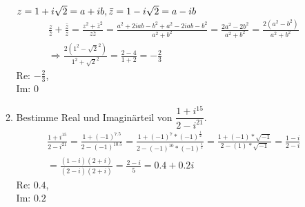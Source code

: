 \documentclass[12pt,letterpaper]{article}
\begin{document}
\begin{enumerate}
\begin{enumerate}
$z = 1+i\sqrt{2} = a+ib,\\
\bar{z} = 1-i\sqrt{2} = a-ib$
\begin{align*}
\frac{z}{\bar{z}}+\frac{\bar{z}}{z} = \frac{z^2+\bar{z}^2}{z\bar{z}} = \frac{a^2+2iab-b^2+a^2-2iab-b^2}{a^2+b^2} = \frac{2a^2-2b^2}{a^2+b^2} = \frac{2(a^2-b^2)}{a^2+b^2}\\
\Rightarrow\frac{2(1^2-\sqrt{2}^2)}{1^2+\sqrt{2}^2}=\frac{2-4}{1+2} = -\frac{2}{3}
\end{align*}
Re: $-\frac{2}{3}$,\\
Im: $0$
\item Bestimme Real und Imaginärteil von $\dfrac{1+i^{15}}{2-i^{21}}$.
\begin{align*}
\frac{1+i^{15}}{2-i^{21}} = \frac{1+(-1)^{7.5}}{2-(-1)^{10.5}} = \frac{1+(-1)^7*(-1)^{\frac{1}{2}}}{2-(-1)^{10}*(-1)^{\frac{1}{2}}} = \frac{1+(-1)*\sqrt{-1}}{2-(1)*\sqrt{-1}} = \frac{1-i}{2-i}\\
=\frac{(1-i)(2+i)}{(2-i)(2+i)} = \frac{2-i}{5} = 0.4+0.2i
\end{align*}
Re: $0.4$,\\
Im: $0.2$
\end{enumerate}
\end{enumerate}
\end{document}

